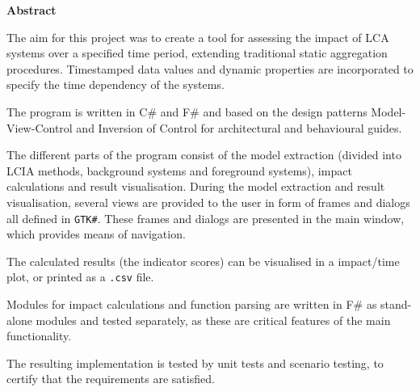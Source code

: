 \vspace*{\fill}
\begin{center}
    \huge \textbf{Abstract}
\end{center}
\normalsize
\vspace{1cm}

The aim for this project was to create a tool for assessing the impact of LCA systems over a specified time period, extending traditional static aggregation procedures. Timestamped data values and dynamic properties are incorporated to specify the time dependency of the systems.

The program is written in C\# and F\# and based on the design patterns Model-View-Control and Inversion of Control for architectural and behavioural guides. 

The different parts of the program consist of the model extraction (divided into LCIA methods, background systems and foreground systems), impact calculations and result visualisation. During the model extraction and result visualisation, several views are provided to the user in form of frames and dialogs all defined in \texttt{GTK\#}. These frames and dialogs are presented in the main window, which provides means of navigation.

The calculated results (the indicator scores) can be visualised in a impact/time plot, or printed as a \texttt{.csv} file.

Modules for impact calculations and function parsing are written in F\# as stand-alone modules and tested separately, as these are critical features of the main functionality.

The resulting implementation is tested by unit tests and scenario testing, to certify that the requirements are satisfied.

\vfill